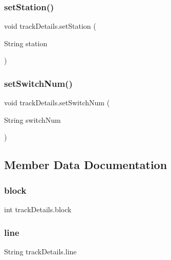 \subsubsection{\texorpdfstring{set\+Station()}{setStation()}}
{\footnotesize\ttfamily void track\+Details.\+set\+Station (\begin{DoxyParamCaption}\item[{String}]{station }\end{DoxyParamCaption})}

\mbox{\label{classtrackDetails_a12c839239d3bf567b166ad5e71dd88b7}} 
\subsubsection{\texorpdfstring{set\+Switch\+Num()}{setSwitchNum()}}
{\footnotesize\ttfamily void track\+Details.\+set\+Switch\+Num (\begin{DoxyParamCaption}\item[{String}]{switch\+Num }\end{DoxyParamCaption})}



\subsection{Member Data Documentation}
\mbox{\label{classtrackDetails_a13669b99469f4b78df534fbb72f4143d}} 
\subsubsection{\texorpdfstring{block}{block}}
{\footnotesize\ttfamily int track\+Details.\+block\hspace{0.3cm}{\ttfamily [private]}}

\mbox{\label{classtrackDetails_a8b79c0cfb50c7468da12fa27136ad405}} 
\subsubsection{\texorpdfstring{line}{line}}
{\footnotesize\ttfamily String track\+Details.\+line\hspace{0.3cm}{\ttfamily [private]}}

